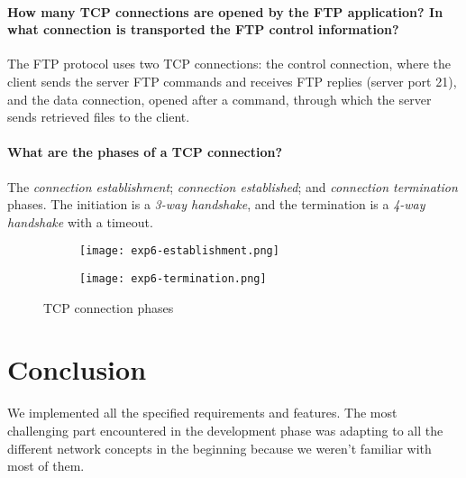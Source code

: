\documentclass[compilation.tex]{subfiles}
\begin{document}
	\paragraph{How many TCP connections are opened by the FTP application? In what connection is transported the FTP control information?}
	The FTP protocol uses two TCP connections: the control connection, where the client sends the server FTP commands and receives FTP replies (server port 21), and the data connection, opened after a  command, through which the server sends retrieved files to the client.
	
	\paragraph{What are the phases of a TCP connection?}
	The \textsl{connection establishment}; \textsl{connection established}; and \textsl{connection termination} phases. The initiation is a \textit{3-way handshake}, and the termination is a \textit{4-way handshake} with a timeout.
	
	\begin{figure}[hbt]
		\centering
		\begin{subfigure}[b]{\textwidth}
			\centering
			\texttt{[image: exp6-establishment.png]}
			\vspace*{.8\baselineskip}
		\end{subfigure}
		\begin{subfigure}[b]{\textwidth}
			\centering
			\texttt{[image: exp6-termination.png]}
			\vspace*{.8\baselineskip}
		\end{subfigure}
		\caption{TCP connection phases}
		\label{fig:exp6-phases}
	\end{figure}
	
	
	\section{Conclusion}
	\label{sec:conclusion}
	  We implemented all the specified requirements and features. The most challenging part encountered in the development phase was adapting to all the different network concepts in the beginning because we weren’t familiar with most of them.
	
\end{document}
